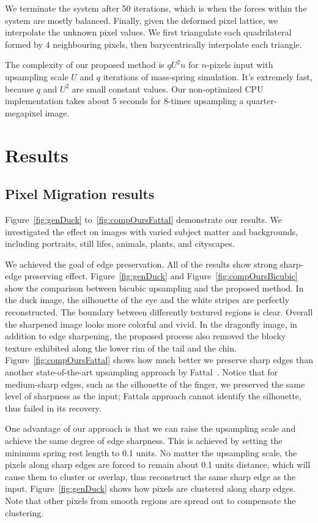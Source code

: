 We terminate the system after 50 iterations, which is when the forces within the system are mostly balanced. Finally, given the deformed pixel lattice, we interpolate the unknown pixel values. We first triangulate each quadrilateral formed by 4 neighbouring pixels, then barycentrically interpolate each triangle. 

The complexity of our proposed method is $qU^2n$ for $n$-pixels input with upsampling scale $U$ and $q$ iterations of mass-spring simulation. It’s extremely fast, because $q$ and $U^2$ are small constant values. Our non-optimized CPU implementation takes about 5 seconds for 8-times upsampling a quarter-megapixel image.



\section{Results}\label{PM:result}

\subsection{Pixel Migration results}

Figure~\ref{fig:genDuck} to~\ref{fig:compOursFattal} demonstrate our results. We investigated the effect on images with varied subject matter and backgrounds, including portraits, still lifes, animals, plants, and cityscapes. 

We achieved the goal of edge preservation. All of the results show strong sharp-edge preserving effect. Figure~\ref{fig:genDuck} and Figure~\ref{fig:compOursBicubic} show the comparison between bicubic upsampling and the proposed method. In the duck image, the silhouette of the eye and the white stripes are perfectly reconstructed. The boundary between differently textured regions is clear. Overall the sharpened image looks more colorful and vivid. In the dragonfly image, in addition to edge sharpening, the proposed process also removed the blocky texture exhibited along the lower rim of the tail and the chin. Figure~\ref{fig:compOursFattal} shows how much better we preserve sharp edges than another state-of-the-art upsampling approach by Fattal~\cite{FAT:EdgeStatistics}. Notice that for medium-sharp edges, such as the silhouette of the finger, we preserved the same level of sharpness as the input; Fattal\textquotesingle s approach cannot identify the silhouette, thus failed in its recovery.

One advantage of our approach is that we can raise the upsampling scale and achieve the same degree of edge sharpness. This is achieved by setting the minimum spring rest length to 0.1 units. No matter the upsampling scale, the pixels along sharp edges are forced to remain about 0.1 units distance, which will cause them to cluster or overlap, thus reconstruct the same sharp edge as the input. Figure~\ref{fig:genDuck} shows how pixels are clustered along sharp edges. Note that other pixels from smooth regions are spread out to compensate the clustering. 


